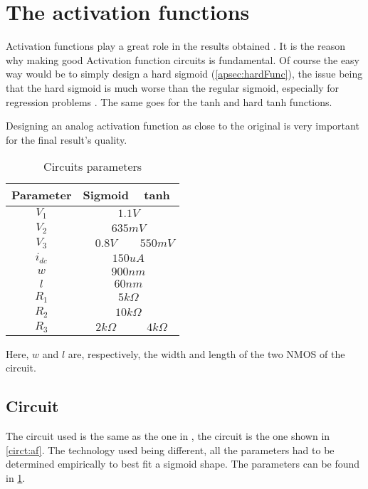 \section{The activation functions}
\label{sec:af}

Activation functions play a great role in the results obtained \cite{af}. It is the reason why making good Activation function circuits is fundamental. Of course the easy way would be to simply design a hard sigmoid (\cref{apsec:hardFunc}), the issue being that the hard sigmoid is much worse than the regular sigmoid, especially for regression problems \cite{hardSigm}. The same goes for the \ac{tanh} and hard \ac{tanh} functions.

Designing an analog activation function as close to the original is very important for the final result's quality.

\begin{table}[H]
  \centering
  \begin{tabular}{|c|c|c|}
    \hline
    \rowcolor{gray}
    Parameter & Sigmoid & \ac{tanh} \\
    \hline
    $V_1$ & \multicolumn{2}{c|}{$1.1V$}\\
    \hline
    $V_2$ & \multicolumn{2}{c|}{$635mV$}\\
    \hline
    $V_3$ & $0.8V$ & $550mV$\\
    \hline
    $i_{dc}$ & \multicolumn{2}{c|}{$150uA$}\\
    \hline
    $w$ & \multicolumn{2}{c|}{$900nm$}\\
    \hline
    $l$ & \multicolumn{2}{c|}{$60nm$}\\
    \hline
    $R_1$ & \multicolumn{2}{c|}{$5k\Omega$}\\
    \hline
    $R_2$ & \multicolumn{2}{c|}{$10k\Omega$}\\
    \hline
    $R_3$ & $2k\Omega$ & $4k\Omega$\\
    \hline
  \end{tabular}
  \caption{Circuits parameters}
  \label{tab:afPar}
\end{table}

Here, $w$ and $l$ are, respectively, the width and length of the two NMOS of the circuit.

\subsection{Circuit}

The circuit used is the same as the one in \cite{thesisRef}, the circuit is the one shown in \cref{circt:af}. The technology used being different, all the parameters had to be determined empirically to best fit a sigmoid shape. The parameters can be found in \cref{tab:afPar}.

